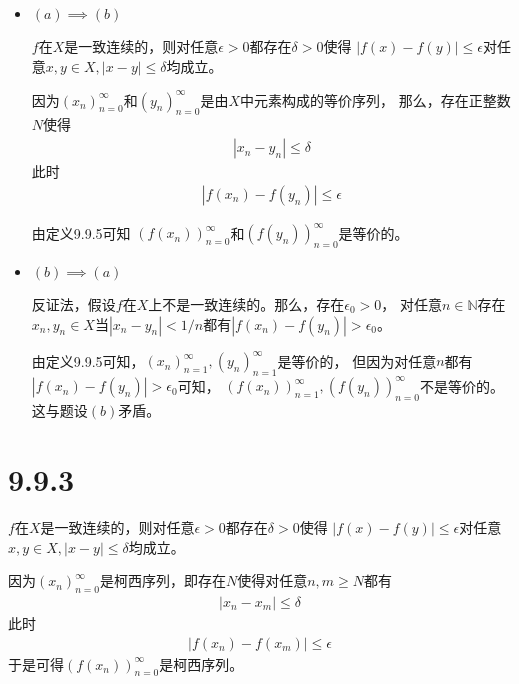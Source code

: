 \documentclass{article}
\begin{document}
\begin{itemize}
  \item $(a) \implies (b)$

        $f$在$X$是一致连续的，则对任意$\epsilon > 0$都存在$\delta > 0$使得
        $|f(x) - f(y)| \leq \epsilon$对任意$x, y \in X, |x - y| \leq \delta$均成立。

        因为$(x_n)_{n=0}^\infty$和$(y_n)_{n=0}^\infty$是由$X$中元素构成的等价序列，
        那么，存在正整数$N$使得
        \begin{align*}
          |x_n - y_n| \leq \delta
        \end{align*}
        此时
        \begin{align*}
          | f(x_n) - f(y_n) | \leq \epsilon
        \end{align*}

        由定义9.9.5可知
        $(f(x_n))_{n=0}^\infty$和$(f(y_n))_{n=0}^\infty$是等价的。


  \item $(b) \implies (a)$

        反证法，假设$f$在$X$上不是一致连续的。那么，存在$\epsilon_0 > 0$，
        对任意$n \in \mathbb{N}$存在$x_n, y_n \in X$当$|x_n - y_n| < 1/n$都有$|f(x_n) - f(y_n)| > \epsilon_0$。

        由定义9.9.5可知，$(x_n)_{n=1}^\infty, (y_n)_{n=1}^\infty$是等价的，
        但因为对任意$n$都有$|f(x_n) - f(y_n)| > \epsilon_0$可知，
        $(f(x_n))_{n=1}^\infty,(f(y_n))_{n=0}^\infty$不是等价的。
        这与题设$(b)$矛盾。
\end{itemize}

\section*{9.9.3}

$f$在$X$是一致连续的，则对任意$\epsilon > 0$都存在$\delta > 0$使得
$|f(x) - f(y)| \leq \epsilon$对任意$x, y \in X, |x - y| \leq \delta$均成立。

因为$(x_n)_{n=0}^\infty$是柯西序列，即存在$N$使得对任意$n,m \geq N$都有
\begin{align*}
  |x_n - x_m| \leq \delta
\end{align*}
此时
\begin{align*}
  |f(x_n) - f(x_m)| \leq \epsilon
\end{align*}
于是可得$(f(x_n))_{n=0}^\infty$是柯西序列。
\end{document}
